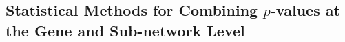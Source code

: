\documentclass[10pt]{article}
\newcommand\example[1]{\hspace{10mm}\framebox{#1}}
\begin{document}


\subsection*{Statistical Methods for Combining $p$-values at the Gene and Sub-network Level}
\label{ancGWAS}
\end{document}
